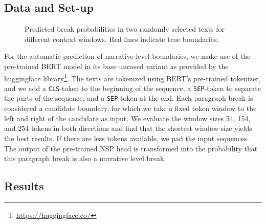 \documentclass[10pt, a4paper]{article}
\begin{document}
\subsection{Data and Set-up}

\begin{figure}[th]
\caption{Predicted break probabilities in two randomly selected texts for different context windows. Red lines indicate true boundaries.}
\label{fig:probabilities}
\end{figure}


For the automatic prediction of narrative level boundaries, we make use of the pre-trained BERT model \cite{devlin-etal-2019-bert} in its base uncased variant as provided by the huggingface library\footnote{\url{https://huggingface.co/}}. 
The texts are tokenized using BERT's pre-trained tokenizer, and we add a \texttt{CLS}-token to the beginning of the sequence, a \texttt{SEP}-token to separate the parts of the sequence, and a \texttt{SEP}-token at the end. 
Each paragraph break is considered a candidate boundary, for which we take a fixed token window to the left and right of the candidate as input. We evaluate the window sizes 54, 154, and 254 tokens in both directions and find that the shortest window size yields the best results. If there are less tokens available, we pad the input sequences. The output of the pre-trained NSP head is transformed into the probability that this paragraph break is also a narrative level break.

\subsection{Results}
\end{document}
